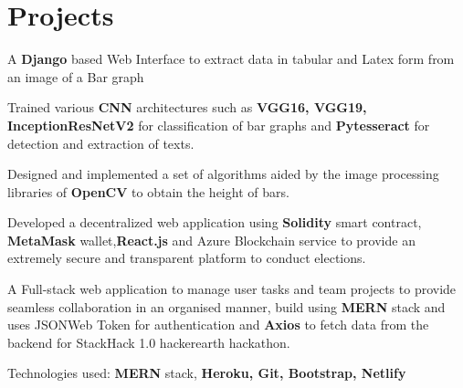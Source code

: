 \documentclass[]{deedy-resume-openfont}
\begin{document}
\begin{minipage}[t]{0.63\textwidth}


\section{Projects}

\vspace{\topsep} %
\begin{tightemize}
\item {A \textbf{Django} based Web Interface to extract data in tabular and Latex form from an image of a Bar graph} 
\item Trained various \textbf{CNN} architectures such as \textbf{VGG16, VGG19, InceptionResNetV2} for classification of bar graphs and \textbf{Pytesseract} for detection and extraction of texts.
\item Designed and implemented a set of algorithms aided by the image processing libraries of \textbf{OpenCV} to obtain the height of bars.
\end{tightemize}
\sectionsep

\begin{tightemize}
\item Developed a decentralized web application using \textbf{Solidity} smart contract, \textbf{MetaMask} wallet,\textbf{React.js} and Azure Blockchain service to provide an extremely secure and transparent platform to conduct elections.
\end{tightemize}
\sectionsep

\begin{tightemize}
\item A Full-stack web application to manage user tasks and team projects to provide seamless collaboration in an organised manner, build using \textbf{MERN} stack and uses JSONWeb Token for authentication and \textbf{Axios} to fetch data from the backend for StackHack 1.0 hackerearth hackathon.
\item Technologies used: \textbf{MERN} stack, \textbf{Heroku, Git, Bootstrap, Netlify}
\end{tightemize}
\sectionsep


\end{minipage}
\end{document}
